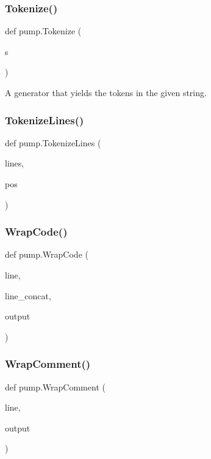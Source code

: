 \subsubsection{\texorpdfstring{Tokenize()}{Tokenize()}}
{\footnotesize\ttfamily def pump.\+Tokenize (\begin{DoxyParamCaption}\item[{}]{s }\end{DoxyParamCaption})}

\begin{DoxyVerb}A generator that yields the tokens in the given string.\end{DoxyVerb}
 \mbox{\label{namespacepump_aa383d59e8e2a9507a576fd4c6b68b6b7}} 
\subsubsection{\texorpdfstring{TokenizeLines()}{TokenizeLines()}}
{\footnotesize\ttfamily def pump.\+Tokenize\+Lines (\begin{DoxyParamCaption}\item[{}]{lines,  }\item[{}]{pos }\end{DoxyParamCaption})}

\mbox{\label{namespacepump_a42502545a37fcd4513a0a7ac8ef3c0eb}} 
\subsubsection{\texorpdfstring{WrapCode()}{WrapCode()}}
{\footnotesize\ttfamily def pump.\+Wrap\+Code (\begin{DoxyParamCaption}\item[{}]{line,  }\item[{}]{line\+\_\+concat,  }\item[{}]{output }\end{DoxyParamCaption})}

\mbox{\label{namespacepump_a73951c98652038351b1cd24291433e12}} 
\subsubsection{\texorpdfstring{WrapComment()}{WrapComment()}}
{\footnotesize\ttfamily def pump.\+Wrap\+Comment (\begin{DoxyParamCaption}\item[{}]{line,  }\item[{}]{output }\end{DoxyParamCaption})}

